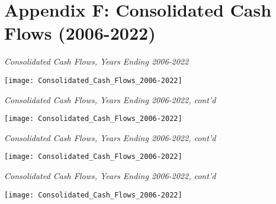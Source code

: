 
\chapter{Appendix F: Consolidated Cash Flows (2006-2022)}\indent%

\begin{landscape}
  \begin{table}[htbp]
    \hspace{-2in}
    \caption[Consolidated Cash Flows, Years Ending 2006–2022]{\textit{Consolidated Cash Flows, Years Ending 2006-2022}}%
    \label{tab:consolidated_cash_flows} %
    \vspace{-1in}\hspace{-2in}
    \texttt{[image: Consolidated\_Cash\_Flows\_2006-2022]} %
  \end{table}
\end{landscape}

\begin{landscape}
  \begin{table}[htbp]
    \vspace{-0.5in}\hspace{-2in}
    \caption*{\textit{Consolidated Cash Flows, Years Ending 2006-2022, cont'd}}
    \vspace{-1in}\hspace{-2in}
    \texttt{[image: Consolidated\_Cash\_Flows\_2006-2022]} %
  \end{table}
\end{landscape}

\begin{landscape}
  \begin{table}[htbp]
    \vspace{-0.5in}\hspace{-2in}
    \caption*{\textit{Consolidated Cash Flows, Years Ending 2006-2022, cont'd}}
    \vspace{-1in}\hspace{-2in}
    \texttt{[image: Consolidated\_Cash\_Flows\_2006-2022]} %
  \end{table}
\end{landscape}

\begin{landscape}
  \begin{table}[htbp]
    \vspace{-0.5in}\hspace{-2in}
    \caption*{\textit{Consolidated Cash Flows, Years Ending 2006-2022, cont'd}}
    \vspace{-1in}\hspace{-2in}
    \texttt{[image: Consolidated\_Cash\_Flows\_2006-2022]} %
  \end{table}
\end{landscape}

